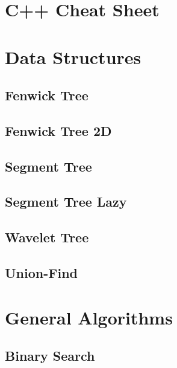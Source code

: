 \documentclass[10pt,landscape,twocolumn,a4paper,notitlepage]{article}
\begin{document}
\def\title{Calce Team}
\tableofcontents\newpage


\section{C++ Cheat Sheet}



\section{Data Structures}
  \subsection{Fenwick Tree}
  

  \subsection{Fenwick Tree 2D}
  

  \subsection{Segment Tree}
  

  \subsection{Segment Tree Lazy}
  

  \subsection{Wavelet Tree}
  

  \subsection{Union-Find}
  

\section{General Algorithms}
  \subsection{Binary Search}
  
\end{document}
